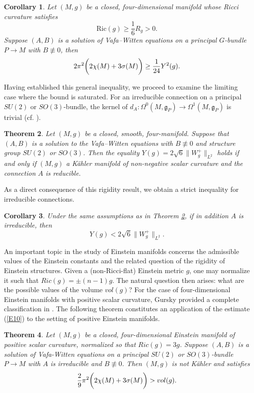 \documentclass[12pt, twoside]{article}
\newtheorem{theorem}{Theorem}[section]
\newtheorem{corollary}[theorem]{Corollary}
\theoremstyle{definition}
\numberwithin{equation}{section}
\def\Om{\Omega}
\begin{document}
\begin{corollary}\label{C2}
	Let $(M,g)$ be a closed, four-dimensional manifold whose Ricci curvature satisfies
	$$\mathrm{Ric}(g)\geq\frac{1}{6}R_{g}>0.$$
	Suppose $(A,B)$ is a solution of Vafa--Witten equations on a principal $G$-bundle $P\rightarrow M$ with $B\not\equiv0$, then
	\[2\pi^{2}\bigg{(}2\chi(M)+3\sigma(M)\bigg{)}\geq\frac{1}{24}Y^{2}(g).\]
\end{corollary}

Having established this general inequality, we proceed to examine the limiting case where the bound is saturated. For an irreducible connection on a principal $SU(2)$ or $SO(3)$-bundle,  the kernel of $d_{A}:\Om^{0}(M,\mathfrak{g}_{P})\rightarrow \Om^{1}(M,\mathfrak{g}_{P})$ is trivial (cf. \cite{DK90,FU91}).

\begin{theorem}\label{T2}
Let $(M,g)$ be a closed, smooth, four-manifold. Suppose that $(A,B)$ is a solution to the Vafa--Witten equations with $B\not\equiv0$ and structure group $SU(2)$ or $SO(3)$. Then the equality $Y(g)=2\sqrt{6}\|W^{+}_{g}\|_{L^{2}}$ holds if and only if $(M,g)$ a K\"{a}hler manifold of non-negative scalar curvature and the connection $A$ is reducible.
\end{theorem}

As a direct consequence of this rigidity result, we obtain a strict inequality for irreducible connections.

\begin{corollary}
Under the same assumptions as in Theorem \ref{T2}, if in addition $A$ is irreducible, then
	\[Y(g)<2\sqrt{6}\|W^{+}_{g}\|_{L^{2}}.\]
\end{corollary}

An important topic in the study of Einstein manifolds concerns the admissible values of the Einstein constants and the related question 
of the rigidity of Einstein structures.  Given a (non-Ricci-flat) Einstein metric $g$, one may normalize it such that $Ric(g)=\pm(n-1)g$. 
The natural question then arises: what are the possible values of the volume $vol(g)$? For the case of four-dimensional Einstein manifolds with positive scalar curvature, Gursky provided a complete classification in \cite{Gur00}. 
The following theorem constitutes an application of the estimate (\ref{E10}) to the setting of positive Einstein manifolds.

\begin{theorem}\label{T3}
Let $(M,g)$ be a closed, four-dimensional Einstein manifold of positive scalar curvature, normalized so that $Ric(g)=3g$. Suppose $(A,B)$ is a solution of Vafa-Witten equations on a principal $SU(2)$ or $SO(3)$-bundle $P\rightarrow M$ with $A$ is irreducible and $B\not\equiv0$. 
Then $(M,g)$ is not K\"{a}hler and satisfies \[\frac{2}{9}\pi^{2}\bigg{(}2\chi(M)+3\sigma(M)\bigg{)}>vol(g). \]
\end{theorem}
\end{document}
